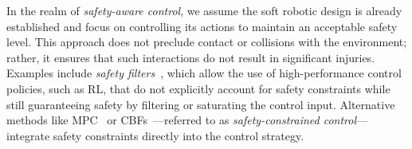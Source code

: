 In the realm of \emph{safety-aware control}, we assume the soft robotic design is already established and focus on controlling its actions to maintain an acceptable safety level. This approach does not preclude contact or collisions with the environment; rather, it ensures that such interactions do not result in significant injuries. Examples include \emph{safety filters}~\citep{bertino2023prescribed}, which allow the use of high-performance control policies, such as \gls{RL}, that do not explicitly account for safety constraints while still guaranteeing safety by filtering or saturating the control input. Alternative methods like \gls{MPC}~\citep{hewing2020learning, pupa2024efficient} or \glspl{CBF}~\citep{ames2016control, ferraguti2020control}—referred to as \emph{safety-constrained control}—integrate safety constraints directly into the control strategy.

